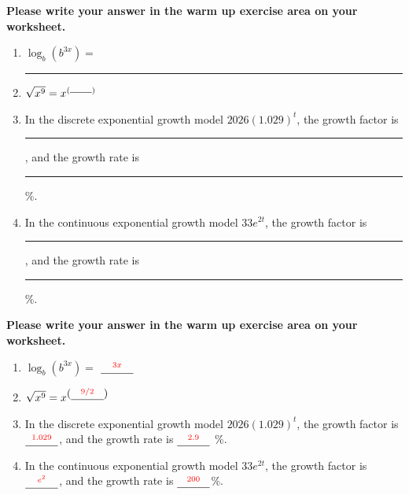 \documentclass[10pt]{beamer}
\begin{document}
\begin{frame}
\textbf{Please write your answer in the warm up exercise area on your worksheet. }
\begin{enumerate}[leftmargin = *, label = (\arabic*), itemsep=2em]
\item
$\log_b(b^{3x}) = $ \rule{3em}{0.4pt}
\item $\sqrt{x^9} = x^{(\rule{2em}{0.4pt})}$
\item In the discrete exponential growth model $2026(1.029)^t$, the growth factor is \rule{3em}{0.4pt}, and the growth rate is \rule{3em}{0.4pt} \%.
\item In the continuous exponential growth model $33e^{2t}$, the growth factor is \rule{3em}{0.4pt}, and the growth rate is \rule{3em}{0.4pt}\%.
\end{enumerate}
\end{frame}
\begin{frame}
\textbf{Please write your answer in the warm up exercise area on your worksheet. }
\begin{enumerate}[leftmargin = *, label = (\arabic*), itemsep=2em]
\item
$\log_b(b^{3x}) = $ $\substack{ {\color{red} 3x}\\ \rule{3em}{0.4pt}}$
\item $\sqrt{x^9} = x^{\left(\substack{ {\color{red} 9/2}\\ \rule{3em}{0.4pt}}\right)}$
\item In the discrete exponential growth model $2026(1.029)^t$, the growth factor is $\substack{ {\color{red} 1.029}\\ \rule{3em}{0.4pt}}$, and the growth rate is $\substack{ {\color{red} 2.9}\\ \rule{3em}{0.4pt}}$ \%.
\item In the continuous exponential growth model $33e^{2t}$, the growth factor is $\substack{ {\color{red} e^2}\\ \rule{3em}{0.4pt}}$, and the growth rate is $\substack{ {\color{red} 200}\\ \rule{3em}{0.4pt}}$\%.
\end{enumerate}
\end{frame}
\end{document}
